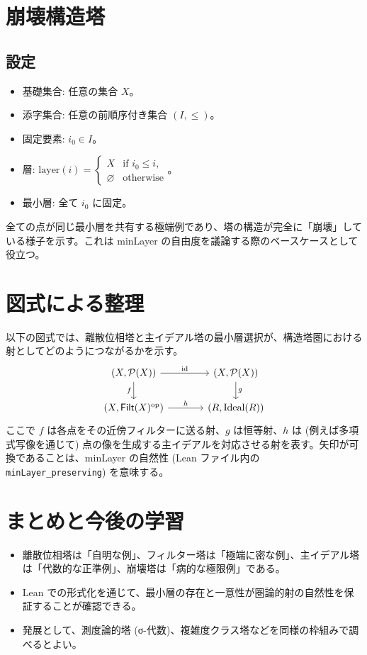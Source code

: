 \documentclass[11pt]{ltjsarticle}
\begin{document}
\section{崩壊構造塔}
\subsection*{設定}
\begin{itemize}
  \item 基礎集合: 任意の集合 $X$。
  \item 添字集合: 任意の前順序付き集合 $(I,\le)$。
  \item 固定要素: $i_0 \in I$。
  \item 層: $\text{layer}(i) = \begin{cases}X & \text{if } i_0 \le i, \\ \varnothing & \text{otherwise}\end{cases}$。
  \item 最小層: 全て $i_0$ に固定。
\end{itemize}
全ての点が同じ最小層を共有する極端例であり、塔の構造が完全に「崩壊」している様子を示す。これは minLayer の自由度を議論する際のベースケースとして役立つ。

\section{図式による整理}
以下の図式では、離散位相塔と主イデアル塔の最小層選択が、構造塔圏における射としてどのようにつながるかを示す。
\[
\begin{tikzcd}[column sep=large]
  (X, \mathcal{P}(X)) \ar[r, "\operatorname{id}"] \ar[d, "f"'] & (X, \mathcal{P}(X)) \ar[d, "g"] \\
  (X, \mathsf{Filt}(X)^{\mathrm{op}}) \ar[r, "h"] & (R, \operatorname{Ideal}(R))
\end{tikzcd}
\]
ここで $f$ は各点をその近傍フィルターに送る射、$g$ は恒等射、$h$ は (例えば多項式写像を通じて) 点の像を生成する主イデアルを対応させる射を表す。矢印が可換であることは、minLayer の自然性 (Lean ファイル内の \texttt{minLayer\_preserving}) を意味する。

\section*{まとめと今後の学習}
\begin{itemize}
  \item 離散位相塔は「自明な例」、フィルター塔は「極端に密な例」、主イデアル塔は「代数的な正準例」、崩壊塔は「病的な極限例」である。
  \item Lean での形式化を通じて、最小層の存在と一意性が圏論的射の自然性を保証することが確認できる。
  \item 発展として、測度論的塔 (σ-代数)、複雑度クラス塔などを同様の枠組みで調べるとよい。
\end{itemize}
\end{document}
